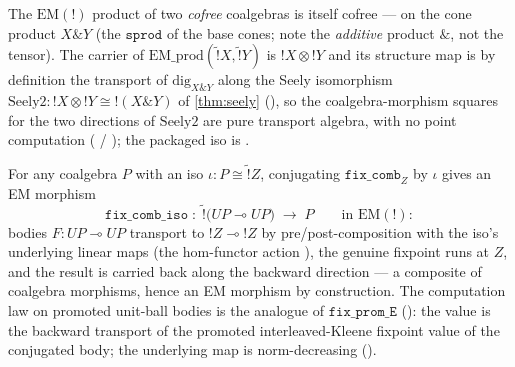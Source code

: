 \begin{lemma}%
\label{lem:cbv-seely2-em}
\rocqok
{}\rocqok
{}\rocqok
{}\rocqok
{}
The $\mathrm{EM}(\mathord{!})$ product of two \emph{cofree}
coalgebras is itself cofree --- on the cone product
$X \mathbin{\&} Y$ (the $\mathtt{sprod}$ of the base cones; note the
\emph{additive} product $\&$, not the tensor). The carrier of
$\mathrm{EM\_prod}(\widetilde{\mathord{!}}X,
\widetilde{\mathord{!}}Y)$ is $\mathord{!}X \otimes \mathord{!}Y$ and
its structure map is by definition the transport of
$\mathrm{dig}_{X \& Y}$ along the Seely isomorphism
$\mathrm{Seely2} : \mathord{!}X \otimes \mathord{!}Y \cong
\mathord{!}(X \mathbin{\&} Y)$ of \autoref{thm:seely}
(), so the
coalgebra-morphism squares for the two directions of
$\mathrm{Seely2}$ are pure transport algebra, with no point
computation
( /
); the
packaged iso is
.
\end{lemma}

\begin{theorem}%
\label{thm:cbv-fix-comb-iso}
\rocqok
{}\rocqok
{}\rocqok
{}\rocqok
{}
For any coalgebra $P$ with an iso
$\iota : P \cong \widetilde{\mathord{!}}Z$, conjugating
$\mathtt{fix\_comb}_Z$ by $\iota$ gives an EM morphism
\[
  \mathtt{fix\_comb\_iso}\;:\;
  \widetilde{\mathord{!}}\bigl(U P \multimap U P\bigr)
  \;\longrightarrow\;
  P
  \qquad\text{in } \mathrm{EM}(\mathord{!}):
\]
bodies $F : U P \multimap U P$ transport to
$\mathord{!}Z \multimap \mathord{!}Z$ by pre/post-composition with
the iso's underlying linear maps (the hom-functor action
), the
genuine fixpoint runs at $Z$, and the result is carried back along
the backward direction --- a composite of coalgebra morphisms, hence
an EM morphism by construction. The computation law on promoted
unit-ball bodies is the analogue of $\mathtt{fix\_prom\_E}$
(): the
value is the backward transport of the promoted interleaved-Kleene
fixpoint value of the conjugated body; the underlying map is
norm-decreasing
().
\end{theorem}

